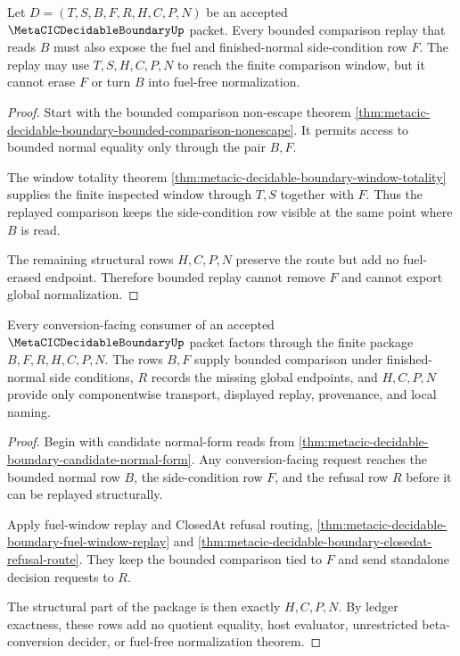 \begin{theorem}
\label{thm:metacic-decidable-boundary-fuel-window-replay}
Let $D=(T,S,B,F,R,H,C,P,N)$ be an accepted $\MetaCICDecidableBoundaryUp$ packet. Every bounded comparison replay that reads $B$ must also expose the fuel and finished-normal side-condition row $F$. The replay may use $T,S,H,C,P,N$ to reach the finite comparison window, but it cannot erase $F$ or turn $B$ into fuel-free normalization.
\end{theorem}
\begin{proof}
Start with the bounded comparison non-escape theorem \autoref{thm:metacic-decidable-boundary-bounded-comparison-nonescape}. It permits access to bounded normal equality only through the pair $B,F$.

The window totality theorem \autoref{thm:metacic-decidable-boundary-window-totality} supplies the finite inspected window through $T,S$ together with $F$. Thus the replayed comparison keeps the side-condition row visible at the same point where $B$ is read.

The remaining structural rows $H,C,P,N$ preserve the route but add no fuel-erased endpoint. Therefore bounded replay cannot remove $F$ and cannot export global normalization.
\end{proof}

\begin{theorem}
\label{thm:metacic-decidable-boundary-conversion-nonescape-package}
Every conversion-facing consumer of an accepted $\MetaCICDecidableBoundaryUp$ packet factors through the finite package $B,F,R,H,C,P,N$. The rows $B,F$ supply bounded comparison under finished-normal side conditions, $R$ records the missing global endpoints, and $H,C,P,N$ provide only componentwise transport, displayed replay, provenance, and local naming.
\end{theorem}
\begin{proof}
Begin with candidate normal-form reads from \autoref{thm:metacic-decidable-boundary-candidate-normal-form}. Any conversion-facing request reaches the bounded normal row $B$, the side-condition row $F$, and the refusal row $R$ before it can be replayed structurally.

Apply fuel-window replay and ClosedAt refusal routing, \autoref{thm:metacic-decidable-boundary-fuel-window-replay} and \autoref{thm:metacic-decidable-boundary-closedat-refusal-route}. They keep the bounded comparison tied to $F$ and send standalone decision requests to $R$.

The structural part of the package is then exactly $H,C,P,N$. By ledger exactness, these rows add no quotient equality, host evaluator, unrestricted beta-conversion decider, or fuel-free normalization theorem.
\end{proof}


